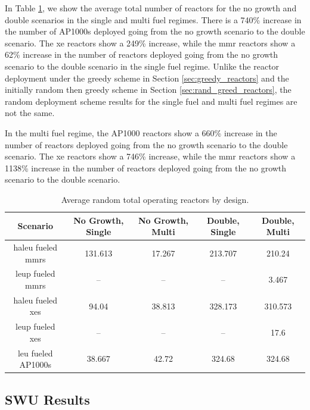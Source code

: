 In Table \ref{tab:random_reac_avg}, we show the average total number of reactors for the no growth and double scenarios in the single and multi fuel regimes. There is a 740\% increase in the number of AP1000s deployed going from the no growth scenario to the double scenario. The \gls{xe} reactors show a 249\% increase, while the \gls{mmr} reactors show a 62\% increase in the number of reactors deployed going from the no growth scenario to the double scenario in the single fuel regime. Unlike the reactor deployment under the greedy scheme in Section \ref{sec:greedy_reactors} and the initially random then greedy scheme in Section \ref{sec:rand_greed_reactors}, the random deployment scheme results for the single fuel and multi fuel regimes are not the same.

In the multi fuel regime, the AP1000 reactors show a 660\% increase in the number of reactors deployed going from the no growth scenario to the double scenario. The \gls{xe} reactors show a 746\% increase, while the \gls{mmr} reactors show a 1138\% increase in the number of reactors deployed going from the no growth scenario to the double scenario.

\begin{table}[H]
    \centering
    \caption{Average random total operating reactors by design.}
    \label{tab:random_reac_avg}
    \begin{tabular}{c c c c c}
       \hline
       Scenario & No Growth, Single & No Growth, Multi & Double, Single & Double, Multi  \\
       \hline
       \gls{haleu} fueled \glspl{mmr} & 131.613 & 17.267  & 213.707 & 210.24  \\
       \gls{leup} fueled \glspl{mmr}  & --      & --      & --      & 3.467   \\
       \gls{haleu} fueled \glspl{xe}  & 94.04   & 38.813  & 328.173 & 310.573 \\
       \gls{leup} fueled \glspl{xe}   & --      & --      & --      & 17.6    \\
       \gls{leu} fueled AP1000s       & 38.667  & 42.72   & 324.68  & 324.68  \\
       \hline
    \end{tabular}
\end{table}




\subsection{SWU Results}
\label{sec:random_swu}

